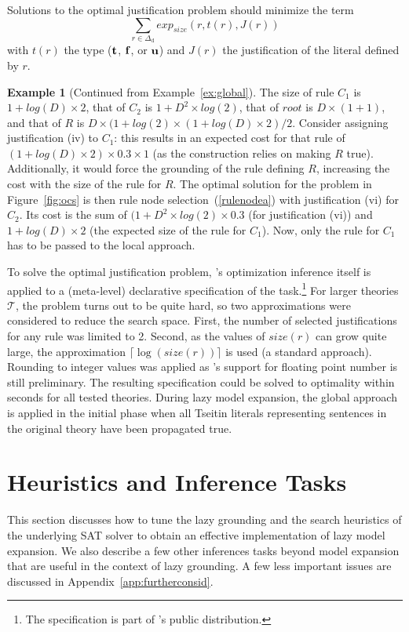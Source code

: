 \documentclass[11pt]{article}
\newcommand{\m}[1]{\ensuremath{#1}\xspace}
\newcommand{\trval}[1]{\m{{\bf #1}}}
\newcommand{\ltrue}{\trval{t}}
\newcommand{\lfalse}{\trval{f}}
\newcommand{\lunkn}{\trval{u}}
\newcommand{\theory}{\m{\mathcal{T}}}
\newcommand{\D}{\m{\Delta}}
\newcommand{\logicname}[1]{\text{\sc #1}\xspace}
\newcommand{\idp}{\logicname{IDP}}
\theoremstyle{plain}
\theoremstyle{definition}
\theoremstyle{example_basic}
\newtheorem{example}[thm]{Example}
\theoremstyle{example_contd}
\theoremstyle{plain}
\newcommand{\Dd}{\ensuremath{\D_\text{d}}\xspace}
\newcommand{\change}[1]{#1}
\begin{document}
Solutions to the optimal justification problem should minimize the
term \[\sum_{r \in \Dd} exp_{size}(r, t(r),J(r))\] with $t(r)$ 
\change{the type (\ltrue, \lfalse, or \lunkn) and $J(r)$ the justification of the literal defined by $r$.}


 \begin{example}[Continued from Example~\ref{ex:global}]
The size of rule $C_1$ is $1 + log(D)\times 2$, that of $C_2$ is $1 + D^2 \times log(2)$,  that of $root$ is $D \times (1 + 1)$, and that of $R$ is $D \times (1 + log(2) \times (1 + log(D) \times 2)/2$.
Consider assigning justification (iv) to $C_1$: this results in an expected cost for that rule of $(1 + log(D) \times 2) \times 0.3 \times 1$ (as the construction relies on making $R$ true). Additionally, it would force the grounding of the rule defining $R$, increasing the cost with the size of the rule for $R$.
The optimal solution for the problem in Figure~\ref{fig:ocs} is then rule node selection~(\ref{rulenodea}) with justification (vi) for $C_2$. Its cost is the sum of $(1+D^2\times log(2) \times 0.3$ (for justification (vi)) and $1+ log(D) \times 2$ (the expected size of the rule for $C_1$). Now, only the rule for $C_1$ has to be passed to the local approach.
 \end{example}

To solve the optimal justification problem, \idp's optimization inference itself is applied to a (meta-level) declarative specification of the task.\footnote{The specification is part of \idp's public distribution.} For larger theories \theory, the problem turns out to be quite hard, so two approximations were considered to reduce the search space. First, the number of selected justifications for any rule was limited to 2. Second, as the values of $size(r)$ can grow quite large, the approximation $\lceil\log(size(r))\rceil$ is used (a standard approach). \change{Rounding to integer values was applied as \idp's support for floating point number is still preliminary.} The resulting specification could be solved to optimality within seconds for all tested theories. 
During lazy model expansion, the global approach is applied in the initial phase when all Tseitin literals representing sentences in the original theory have been propagated true.

\section{Heuristics and Inference Tasks}\label{sec:optimizations}
\change{This section discusses how to tune the lazy grounding and the
  search heuristics of the underlying SAT solver to obtain an
  effective implementation of lazy model expansion. We also describe a
  few other inferences tasks beyond model expansion that are useful in
  the context of lazy grounding. A few less important issues are discussed in Appendix~\ref{app:furtherconsid}. }
\end{document}
